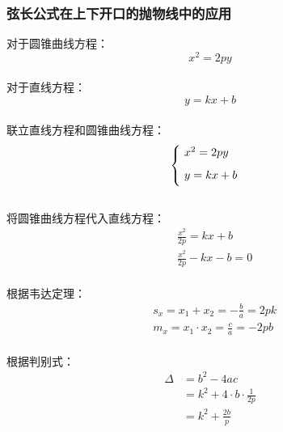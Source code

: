 \documentclass[UTF8]{ctexart}
\begin{document}
\newpage

\subsubsection{弦长公式在上下开口的抛物线中的应用}
    对于圆锥曲线方程：
    \setcounter{equation}{0}
    \begin{equation}
        x^2=2py
    \end{equation}\\
    对于直线方程：
    \begin{equation}
        y=kx+b
    \end{equation}\\
    联立直线方程和圆锥曲线方程：
    \begin{equation}
        \begin{cases}
            \ x^2=2py\\[2mm]
            \ y=kx+b\vspace{3pt}
        \end{cases}
    \end{equation}\\[3mm]
    将圆锥曲线方程代入直线方程：\vspace{5pt}
    \begin{align}
        &\frac{x^2}{2p}=kx+b\\[3mm]
        &\frac{x^2}{2p}-kx-b=0
    \end{align}\\[1mm]
    根据韦达定理：
    \begin{align}
        &s_x=x_1+x_2=-\frac{b}{a}=2pk\\[3mm]
        &m_x=x_1\cdot x_2=\frac{c}{a}=-2pb
    \end{align}\\[1mm]
    根据判别式：
    \begin{align}
        \Delta&=b^2-4ac\\[4mm]
        &=k^2+4\cdot b\cdot\frac{1}{2p}\\[4mm]
        &=k^2+\frac{2b}{p}
    \end{align}

\newpage
\end{document}

